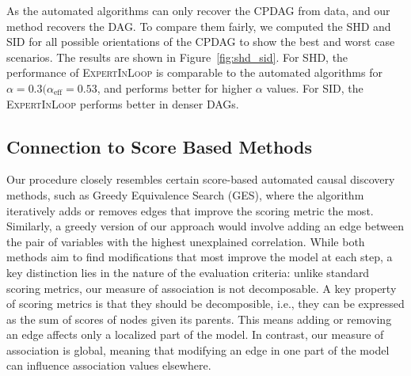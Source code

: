 \documentclass{uai2025} %
\begin{document}

As the automated algorithms can only recover the CPDAG from data, and our
method recovers the DAG. To compare them fairly, we computed the SHD and SID
for all possible orientations of the CPDAG to show the best and worst case
scenarios. The results are shown in Figure~\ref{fig:shd_sid}. For SHD, the
performance of \textsc{ExpertInLoop} is comparable to the automated algorithms
for $ \alpha = 0.3 (\alpha_{\textrm{eff}} = 0.53 $, and performs better for
higher $ \alpha $ values. For SID, the \textsc{ExpertInLoop} performs better in
denser DAGs.

% 	
% 	
% 

\subsection{Connection to Score Based Methods}

Our procedure closely resembles certain score-based automated causal discovery
methods, such as Greedy Equivalence Search (GES), where the algorithm
iteratively adds or removes edges that improve the scoring metric the most.
Similarly, a greedy version of our approach would involve adding an edge
between the pair of variables with the highest unexplained correlation. While
both methods aim to find modifications that most improve the model at each
step, a key distinction lies in the nature of the evaluation criteria: unlike
standard scoring metrics, our measure of association is not decomposable. A key
property of scoring metrics is that they should be decomposible, i.e., they can
be expressed as the sum of scores of nodes given its parents. This means adding
or removing an edge affects only a localized part of the model. In contrast,
our measure of association is global, meaning that modifying an edge in one
part of the model can influence association values elsewhere.
\end{document}
